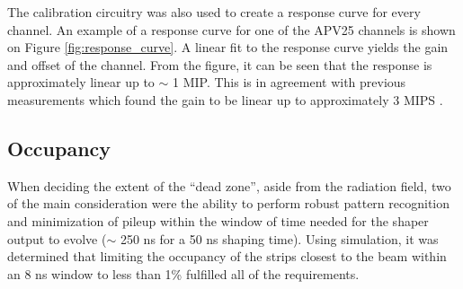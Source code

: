 The calibration circuitry was also used to create a response
curve for every channel.  An example of a response curve for one of the 
APV25 channels is shown on Figure \ref{fig:response_curve}.  A linear fit
to the response curve yields the gain and offset of the channel. From the figure, 
it can be seen that the response is approximately linear up to $\sim$ 1 MIP.
This is in agreement with previous measurements which found the gain to be 
linear up to approximately 3 MIPS \cite{French:2001xb}.

\subsection{Occupancy}

When deciding the extent of the ``dead zone'', aside from the radiation field, 
two of the main consideration were the ability to perform robust pattern 
recognition and minimization of pileup within the window of time needed for 
the shaper output to evolve ($\sim$ 250 ns for a 50 ns shaping time).  Using
simulation, it was determined that limiting the occupancy of the strips closest
to the beam within an 8 ns window to less than 1\% fulfilled all of the requirements. 


